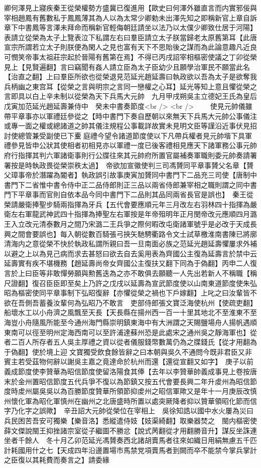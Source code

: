 卿何澤見上寢疾秦王從榮權勢方盛冀已復進用【歐史曰何澤外雖直言而内實邪佞與宰相趙鳳有舊數私于鳳鳳薄其為人以為太常少卿勅未出澤先知之即稱新官上章自訴章下中書鳳等言澤未拜命而稱新官輕侮朝廷請坐以法乃以太僕少卿致仕居于河陽】表請立從榮為太子上覽表泣下私謂左右曰羣臣請立太子朕當歸老太原舊第耳【此唐宣宗所謂若立太子則朕便為閑人之見也富有天下不思貽後之謀而為此論意趣凡近良可憫笑帝事太祖莊宗起於晉陽有舊第在焉】不得已丙戌詔宰相樞密使議之丁卯從榮見上【見賢遍翻】言曰竊聞有姦人請立臣為太子臣幼少且願學治軍民不願當此名【治直之翻】上曰羣臣所欲也從榮退見范延光趙延壽曰執政欲以吾為太子是欲奪我兵柄幽之東宫耳【從榮之言與明宗之言同一戀權之心耳】延光等知上意且懼從榮之言即具以白上辛未制以從榮為天下兵馬大元帥　九月甲戌朔吳主立德妃王氏為皇后戊寅加范延光趙延壽兼侍中　癸未中書奏節度<br />
<br />
　　使見元帥儀雖帶平章事亦以軍禮廷參從之【時中書門下奏自歷朝以來無天下兵馬大元帥公事儀注或專一面之權或總諸道之帥其儀注規程公事載詳故實未見明文臣等謹沿近事伏見招討使總管兼受副使已下櫜庭禮今望令諸道節度使以下凡帶兵權者見元帥堦下具軍禮參見皆申公狀其使相者初相見亦以軍禮一度已後客禮相見應天下諸軍務公事元帥府行指揮其判六軍諸衛事則行公牒往來其元帥府所置官屬補奏軍職則委元帥奏請署署按是時執政畏從榮崇秩太過】　帝欲加宣徽使判三司馮贇同平章事贇父名章【贇父璋事帝於潛躍為閽者】執政誤引故事庚寅加贇同中書門下二品充三司使【唐制中書門下二省惟中書令侍中正二品侍郎則正三品以兩省侍郎兼宰相之職則謂之同中書門下平章事而官則自依本品今同中書門下二品則其品同兩省長官是誤也】　秦王從榮請嚴衛捧聖步騎兩指揮為牙兵【五代會要應順元年三月改左右羽林四十指揮為嚴衛左右軍龍武神武四十指揮為捧聖左右軍按是年帝殂明年正月閔帝改元應順四月潞王入立改元清泰數月之間乃宋潞二王兵爭之際何暇改屯衛諸軍號乎是必改于天成長興之間會要誤也】每入朝從數百騎張弓挾矢馳騁衢路令文士試草檄淮南書陳已將廓清海内之意從榮不快於執政私謂所親曰吾一旦南面必族之范延光趙延壽懼屢求外補以避之上以為見己病而求去甚怒曰欲去自去奚用表為齊國公主復為延壽言於禁中云延壽實有疾不堪機務【趙延壽尚帝女齊國公主復扶又翻下同為于偽翻】丙申二人復言於上曰臣等非敢憚勞願與勲舊迭為之亦不敢俱去願聽一人先出若新人不稱職【稱尺證翻】復召臣臣即至矣上乃許之戊戌以延壽為宣武節度使以山南東道節度使朱弘昭為樞密使同平章事制下弘昭復辭【亦懼從榮之禍也下戶嫁翻】上叱之曰汝輩皆不欲在吾側吾蓄養汝輩何為弘昭乃不敢言　吏部侍郎張文寶泛海使杭州【使疏吏翻】船壞水工以小舟濟之風飄至天長【天長縣在揚州西一百一十里其地北不至淮東不至海豈小舟隨風所能至今通州海門縣崇明鎮東海中有大洲謂之天賜鹽場舟人揚帆遇順東南可以徑至明州定海西南可以至許浦達蘇州恐是此處宋之通州吳之靜海軍也】從者二百人所存者五人吳主厚禮之資以從者儀服錢幣數萬仍為之牒錢氏【從才用翻為于偽翻】使於境上迎文寶獨受飲食餘皆辭之曰本朝與吳久不通問今既非君臣又非賓主若受茲物何辭以謝吳主嘉之竟達命於杭州而還【還從宣翻又如字】　庚子以前義成節度使李贊華為昭信節度使留洛陽食其俸【去年以李贊華帥義成事見上卷按唐末於金州置昭信節度五代兵爭不復以為節鎮又按五代會要長興二年升䖍州為昭信節度時䖍州屬吳吳以為百勝節度贊華所領節抑䖍州之昭信軍歟又是年十一月庚辰改慎州懷化軍為昭化軍慎州在幽州之北唐盛時所置以處突厥降者抑以贊華領昭化節而信字乃化字之誤歟】　辛丑詔大元帥從榮位在宰相上　吳徐知誥以國中水火屢為災曰兵民困苦吾安可獨樂【樂音洛】悉縱遣侍妓【妓渠綺翻】取樂器焚之　閩内樞密使薛文傑說閩王抑挫諸宗室從子繼圖不勝忿【說式苪翻從才用翻勝音升】謀反坐誅連坐者千餘人　冬十月乙卯范延光馮贇奏西北諸胡賣馬者往來如織日用絹無慮五千匹計耗國用什之七【天成四年沿邊置場市馬禁党項賣馬者到闕而卒不能禁今掌兵掌計之臣復以其耗費而奏言之】請委緣